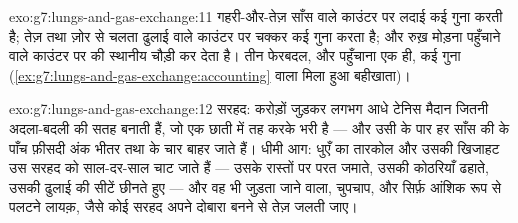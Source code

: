 \begin{solution}{exo:g7:lungs-and-gas-exchange:11}
गहरी-और-तेज़ साँस  वाले काउंटर पर लदाई कई गुना करती है; तेज़ तथा
ज़ोर से चलता  ढुलाई वाले काउंटर पर चक्कर कई गुना करता है; और रुख़
मोड़ना पहुँचाने वाले काउंटर पर  की स्थानीय  चौड़ी कर
देता है। तीन फेरबदल, और पहुँचाना एक ही, कई गुना
(\cref{ex:g7:lungs-and-gas-exchange:accounting} वाला मिला हुआ
बहीखाता)।
\end{solution}

\begin{solution}{exo:g7:lungs-and-gas-exchange:12}
सरहद: करोड़ों  जुड़कर लगभग आधे टेनिस मैदान जितनी अदला-बदली की
सतह बनाती हैं, जो एक छाती में तह करके भरी है --- और उसी के पार हर साँस
की  के पाँच फ़ीसदी अंक भीतर तथा  के चार बाहर
जाते हैं। धीमी आग: धुएँ का तारकोल और उसकी खिजाहट उस सरहद को साल-दर-साल
चाट जाते हैं --- उसके रास्तों पर परत जमाते, उसकी कोठरियाँ ढहाते, उसकी
ढुलाई की सीटें छीनते हुए --- और वह भी जुड़ता जाने वाला, चुपचाप, और
सिर्फ़ आंशिक रूप से पलटने लायक़, जैसे कोई सरहद अपने दोबारा बनने से तेज़
जलती जाए।
\end{solution}

